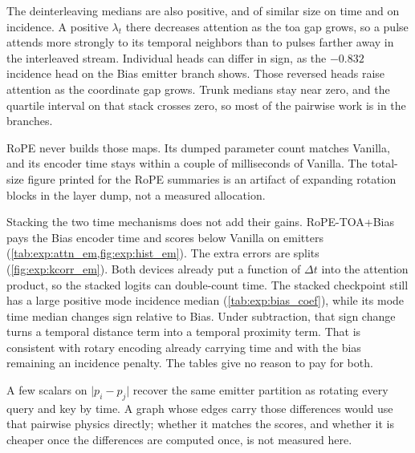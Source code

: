 The deinterleaving medians are also positive, and of similar size on time and on incidence.
A positive $\lambda_t$ there decreases attention as the \gls{toa} gap grows, so a pulse attends more strongly to its temporal neighbors than to pulses farther away in the interleaved stream.
Individual heads can differ in sign, as the $-0.832$ incidence head on the Bias emitter branch shows.
Those reversed heads raise attention as the coordinate gap grows.
Trunk medians stay near zero, and the quartile interval on that stack crosses zero, so most of the pairwise work is in the branches.

RoPE never builds those maps.
Its dumped parameter count matches Vanilla, and its encoder time stays within a couple of milliseconds of Vanilla.
The total-size figure printed for the RoPE summaries is an artifact of expanding rotation blocks in the layer dump, not a measured allocation.

Stacking the two time mechanisms does not add their gains.
RoPE-TOA+Bias pays the Bias encoder time and scores below Vanilla on emitters (\cref{tab:exp:attn_em,fig:exp:hist_em}).
The extra errors are splits (\cref{fig:exp:kcorr_em}).
Both devices already put a function of $\Delta t$ into the attention product, so the stacked logits can double-count time.
The stacked checkpoint still has a large positive mode incidence median (\cref{tab:exp:bias_coef}), while its mode time median changes sign relative to Bias.
Under subtraction, that sign change turns a temporal distance term into a temporal proximity term.
That is consistent with rotary encoding already carrying time and with the bias remaining an incidence penalty.
The tables give no reason to pay for both.

A few scalars on $\lvert p_i-p_j\rvert$ recover the same emitter partition as rotating every query and key by time.
A graph whose edges carry those differences would use that pairwise physics directly; whether it matches the scores, and whether it is cheaper once the differences are computed once, is not measured here.
